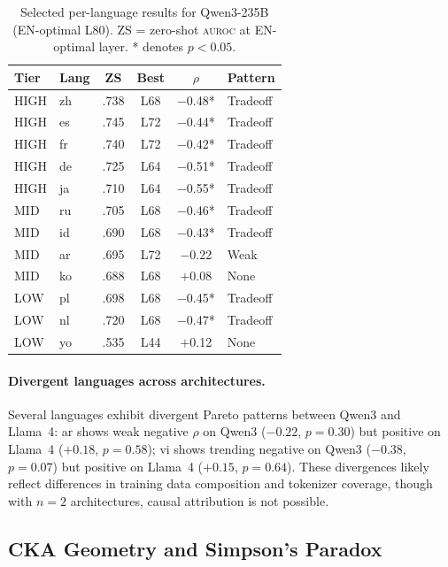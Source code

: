 \documentclass[11pt,a4paper]{article}
\newcommand{\aur}{\textsc{auroc}}
\begin{document}
\begin{table}[t]
\centering
\small
\setlength{\tabcolsep}{3pt}
\begin{tabular}{llcccl}
\toprule
\textbf{Tier} & \textbf{Lang} & \textbf{ZS} & \textbf{Best} & \textbf{$\rho$} & \textbf{Pattern} \\
\midrule
HIGH & zh & .738 & L68 & $-$0.48* & Tradeoff \\
HIGH & es & .745 & L72 & $-$0.44* & Tradeoff \\
HIGH & fr & .740 & L72 & $-$0.42* & Tradeoff \\
HIGH & de & .725 & L64 & $-$0.51* & Tradeoff \\
HIGH & ja & .710 & L64 & $-$0.55* & Tradeoff \\
\midrule
MID & ru & .705 & L68 & $-$0.46* & Tradeoff \\
MID & id & .690 & L68 & $-$0.43* & Tradeoff \\
MID & ar & .695 & L72 & $-$0.22 & Weak \\
MID & ko & .688 & L68 & $+$0.08 & None \\
\midrule
LOW & pl & .698 & L68 & $-$0.45* & Tradeoff \\
LOW & nl & .720 & L68 & $-$0.47* & Tradeoff \\
LOW & yo & .535 & L44 & $+$0.12 & None \\
\bottomrule
\end{tabular}
\caption{Selected per-language results for Qwen3-235B (EN-optimal L80). ZS = zero-shot \aur{} at EN-optimal layer. * denotes $p<0.05$.}
\label{tab:per_lang}
\end{table}

\paragraph{Divergent languages across architectures.}
Several languages exhibit divergent Pareto patterns between Qwen3 and Llama~4: ar shows weak negative $\rho$ on Qwen3 ($-0.22$, $p=0.30$) but positive on Llama~4 ($+0.18$, $p=0.58$); vi shows trending negative on Qwen3 ($-0.38$, $p=0.07$) but positive on Llama~4 ($+0.15$, $p=0.64$). These divergences likely reflect differences in training data composition and tokenizer coverage, though with $n=2$ architectures, causal attribution is not possible.

\subsection{CKA Geometry and Simpson's Paradox}
\label{sec:cka}
\end{document}
